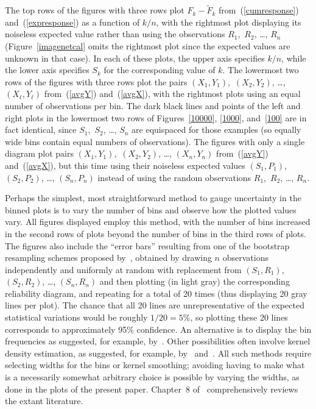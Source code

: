 \documentclass{article}
\begin{document}
The top rows of the figures with three rows plot $F_k-\tilde{F}_k$
from~(\ref{cumresponse}) and~(\ref{expresponse}) as a function of $k/n$,
with the rightmost plot displaying its noiseless expected value
rather than using the observations $R_1$,~$R_2$, \dots, $R_n$
(Figure~\ref{imagenetcal} omits the rightmost plot since the expected values
are unknown in that case).
In each of these plots,
the upper axis specifies $k/n$, while the lower axis specifies $S_k$
for the corresponding value of $k$.
The lowermost two rows of the figures with three rows plot the pairs
$(X_1, Y_1)$,~$(X_2, Y_2)$, \dots, $(X_{\ell}, Y_{\ell})$
from~(\ref{avgY}) and~(\ref{avgX}),
with the rightmost plots using an equal number of observations per bin.
The dark black lines and points of the left and right plots in the lowermost
two rows of Figures~\ref{10000}, \ref{1000}, and~\ref{100} are in fact
identical, since $S_1$,~$S_2$, \dots, $S_n$ are equispaced
for those examples (so equally wide bins contain equal numbers
of observations). The figures with only a single diagram
plot pairs $(X_1, Y_1)$,~$(X_2, Y_2)$, \dots, $(X_n, Y_n)$
from~(\ref{avgY}) and~(\ref{avgX}),
but this time using their noiseless expected values
$(S_1, P_1)$,~$(S_2, P_2)$, \dots, $(S_n, P_n)$
instead of using the random observations $R_1$,~$R_2$, \dots, $R_n$.

Perhaps the simplest, most straightforward method to gauge uncertainty
in the binned plots is to vary the number of bins
and observe how the plotted values vary.
All figures displayed employ this method, with the number of bins increased in
the second rows of plots beyond the number of bins in the third rows of plots.
The figures also include the ``error bars'' resulting
from one of the bootstrap resampling schemes proposed by~\cite{brocker-smith},
obtained by drawing $n$ observations independently and uniformly at random
with replacement from $(S_1, R_1)$, $(S_2, R_2)$, \dots, $(S_n, R_n)$
and then plotting (in light gray) the corresponding reliability diagram,
and repeating for a total of 20 times (thus displaying 20 gray lines per plot).
The chance that all 20 lines are unrepresentative
of the expected statistical variations would be roughly $1/20 = 5$\%,
so plotting these 20 lines corresponds to approximately 95\% confidence.
An alternative is to display the bin frequencies as suggested,
for example, by~\cite{murphy-winkler}.
Other possibilities often involve kernel density estimation,
as suggested, for example, by~\cite{brocker} and~\cite{wilks}.
All such methods require selecting widths for the bins or kernel smoothing;
avoiding having to make what is a necessarily somewhat arbitrary choice
is possible by varying the widths, as done in the plots of the present paper.
Chapter~8 of~\cite{wilks} comprehensively reviews the extant literature.
\end{document}
